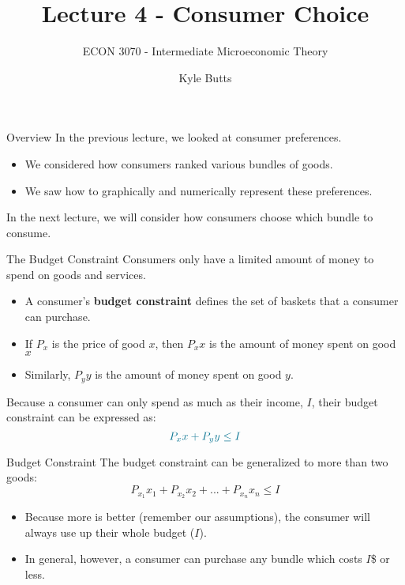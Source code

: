 \documentclass[11pt,t]{beamer}
\author{Kyle Butts}
\title{Lecture 4 - Consumer Choice}
\subtitle{ECON 3070 - Intermediate Microeconomic Theory}
\begin{document}
\begin{frame}
  \titlepage
\end{frame}


\begin{frame}{Overview}
  In the previous lecture, we looked at consumer preferences.
  \begin{itemize}
    \item We considered how consumers ranked various bundles of goods.

    \item We saw how to graphically and numerically represent these preferences.
  \end{itemize}

  \bigskip
  In the next lecture, we will consider how consumers choose which bundle to consume.
\end{frame}


\begin{frame}{The Budget Constraint}
  Consumers only have a limited amount of money to spend on goods and services.
  \begin{itemize}
    \item A consumer's \textbf{budget constraint} defines the set of baskets that a consumer can purchase.
    
    \pause
    \item If $P_x$ is the price of good $x$, then $P_x x$ is the amount of money spent on good $x$
    
    \item Similarly, $P_y y$ is the amount of money spent on good $y$.
  \end{itemize}
  
  \pause\bigskip
  Because a consumer can only spend as much as their income, $I$, their budget constraint can be expressed as:
  $$
    \alice{P_x x + P_y y \leq I}
  $$
\end{frame}



\begin{frame}{Budget Constraint}
  The budget constraint can be generalized to more than two goods:
  $$
    P_{x_1} x_1 + P_{x_2} x_2 + ... + P_{x_n} x_n \leq I
  $$

  \bigskip
  \begin{itemize}
    \item Because more is better (remember our assumptions), the consumer will always use up their whole budget ($I$).

    \item In general, however, a consumer can purchase any bundle which costs $I$\$ or less.
  \end{itemize}
\end{frame}
\end{document}

